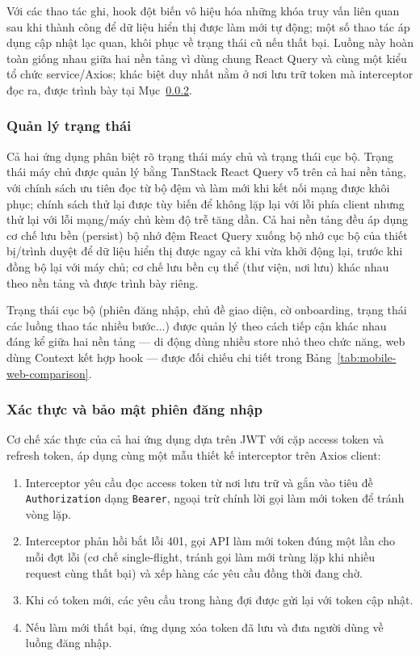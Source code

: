 Với các thao tác ghi, hook đột biến vô hiệu hóa những khóa truy vấn liên quan sau khi thành công để dữ liệu hiển thị được làm mới tự động; một số thao tác áp dụng cập nhật lạc quan, khôi phục về trạng thái cũ nếu thất bại. Luồng này hoàn toàn giống nhau giữa hai nền tảng vì dùng chung React Query và cùng một kiểu tổ chức service/Axios; khác biệt duy nhất nằm ở nơi lưu trữ token mà interceptor đọc ra, được trình bày tại Mục~\ref{subsubsec:frontend-auth}.

\subsubsection{Quản lý trạng thái}
\label{subsubsec:frontend-state}

Cả hai ứng dụng phân biệt rõ trạng thái máy chủ và trạng thái cục bộ. Trạng thái máy chủ được quản lý bằng TanStack React Query v5 trên cả hai nền tảng, với chính sách ưu tiên đọc từ bộ đệm và làm mới khi kết nối mạng được khôi phục; chính sách thử lại được tùy biến để không lặp lại với lỗi phía client nhưng thử lại với lỗi mạng/máy chủ kèm độ trễ tăng dần. Cả hai nền tảng đều áp dụng cơ chế lưu bền (persist) bộ nhớ đệm React Query xuống bộ nhớ cục bộ của thiết bị/trình duyệt để dữ liệu hiển thị được ngay cả khi vừa khởi động lại, trước khi đồng bộ lại với máy chủ; cơ chế lưu bền cụ thể (thư viện, nơi lưu) khác nhau theo nền tảng và được trình bày riêng.

Trạng thái cục bộ (phiên đăng nhập, chủ đề giao diện, cờ onboarding, trạng thái các luồng thao tác nhiều bước...) được quản lý theo cách tiếp cận khác nhau đáng kể giữa hai nền tảng — di động dùng nhiều store nhỏ theo chức năng, web dùng Context kết hợp hook — được đối chiếu chi tiết trong Bảng~\ref{tab:mobile-web-comparison}.

\subsubsection{Xác thực và bảo mật phiên đăng nhập}
\label{subsubsec:frontend-auth}

Cơ chế xác thực của cả hai ứng dụng dựa trên JWT với cặp access token và refresh token, áp dụng cùng một mẫu thiết kế interceptor trên Axios client:

\begin{enumerate}
    \item Interceptor yêu cầu đọc access token từ nơi lưu trữ và gắn vào tiêu đề \texttt{Authorization} dạng \texttt{Bearer}, ngoại trừ chính lời gọi làm mới token để tránh vòng lặp.
    \item Interceptor phản hồi bắt lỗi 401, gọi API làm mới token đúng một lần cho mỗi đợt lỗi (cơ chế single-flight, tránh gọi làm mới trùng lặp khi nhiều request cùng thất bại) và xếp hàng các yêu cầu đồng thời đang chờ.
    \item Khi có token mới, các yêu cầu trong hàng đợi được gửi lại với token cập nhật.
    \item Nếu làm mới thất bại, ứng dụng xóa token đã lưu và đưa người dùng về luồng đăng nhập.
\end{enumerate}

